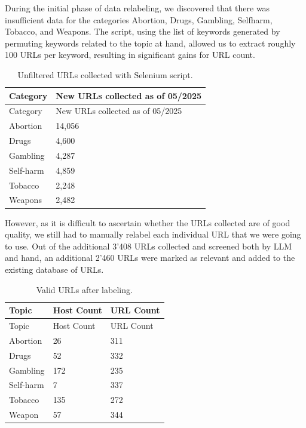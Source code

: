 \documentclass[
  titlepage]{article}
\begin{document}
During the initial phase of data relabeling, we discovered that there
was insufficient data for the categories Abortion, Drugs, Gambling,
Selfharm, Tobacco, and Weapons. The script, using the list of keywords
generated by permuting keywords related to the topic at hand, allowed us
to extract roughly 100 URLs per keyword, resulting in significant gains
for URL count.

\begin{longtable}[]{@{}ll@{}}
\caption{Unfiltered URLs collected with Selenium script.}\tabularnewline
\toprule\noalign{}
Category & New URLs collected as of 05/2025 \\
\midrule\noalign{}
\endfirsthead
\toprule\noalign{}
Category & New URLs collected as of 05/2025 \\
\midrule\noalign{}
\endhead
\bottomrule\noalign{}
\endlastfoot
Abortion & 14,056 \\
Drugs & 4,600 \\
Gambling & 4,287 \\
Self-harm & 4,859 \\
Tobacco & 2,248 \\
Weapons & 2,482 \\
\end{longtable}

However, as it is difficult to ascertain whether the URLs collected are
of good quality, we still had to manually relabel each individual URL
that we were going to use. Out of the additional 3'408 URLs collected
and screened both by LLM and hand, an additional 2'460 URLs were marked
as relevant and added to the existing database of URLs.

\begin{longtable}[]{@{}lll@{}}
\caption{Valid URLs after labeling.}\tabularnewline
\toprule\noalign{}
Topic & Host Count & URL Count \\
\midrule\noalign{}
\endfirsthead
\toprule\noalign{}
Topic & Host Count & URL Count \\
\midrule\noalign{}
\endhead
\bottomrule\noalign{}
\endlastfoot
Abortion & 26 & 311 \\
Drugs & 52 & 332 \\
Gambling & 172 & 235 \\
Self-harm & 7 & 337 \\
Tobacco & 135 & 272 \\
Weapon & 57 & 344 \\
\end{longtable}
\end{document}
